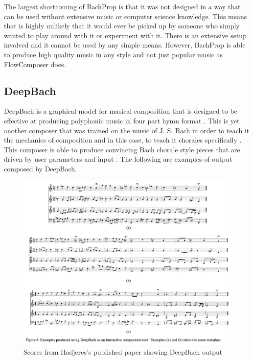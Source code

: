 \vspace{\baselineskip}

The largest shortcoming of BachProp is that it was not designed in a way that can be used without extensive music or computer science knowledge.  This means that is highly unlikely that it would ever be picked up by someone who simply wanted to play around with it or experiment with it.  There is an extensive setup involved and it cannot be used by any simple means.  However, BachProp is able to produce high quality music in any style and not just popular music as FlowComposer does.

\subsection{DeepBach}
\label{subsec:deepbach}

DeepBach is a graphical model for musical composition that is designed to be effective at producing polyphonic music in four part hymn format \cite{Hadjeres_2016}.  This is yet another composer that was trained on the music of J. S. Bach in order to teach it the mechanics of composition and in this case, to teach it chorales specifically \cite{Hadjeres_2016}.  This composer is able to produce convincing Bach chorale style pieces that are driven by user parameters and input \cite{Hadjeres_2016}.  The following are examples of output composed by DeepBach.

\begin{figure}[p]
	\centering
	\caption{Scores from Hadjeres's published paper showing DeepBach output \cite{Hadjeres_2016}}
	\includegraphics[width=\textwidth]{images/deepbachOutput.png}
\end{figure}

